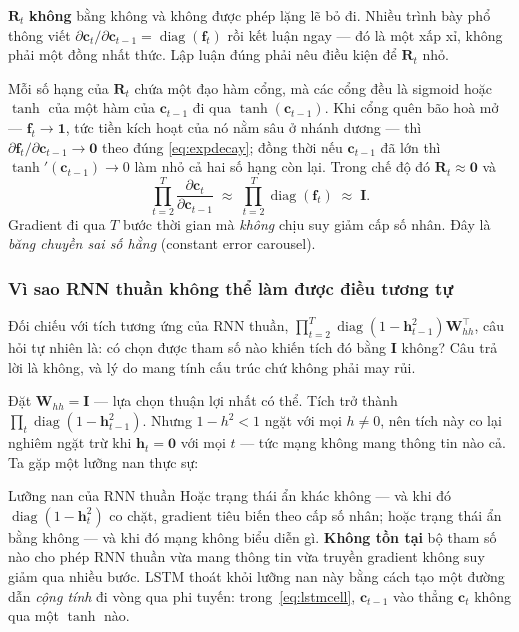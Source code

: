 \begin{notebox}
$\mathbf{R}_t$ \textbf{không} bằng không và không được phép lặng lẽ bỏ đi. Nhiều
trình bày phổ thông viết $\partial\mathbf{c}_t/\partial\mathbf{c}_{t-1} =
\operatorname{diag}(\mathbf{f}_t)$ rồi kết luận ngay --- đó là một xấp xỉ, không
phải một đồng nhất thức. Lập luận đúng phải nêu điều kiện để $\mathbf{R}_t$ nhỏ.
\end{notebox}

Mỗi số hạng của $\mathbf{R}_t$ chứa một đạo hàm cổng, mà các cổng đều là sigmoid
hoặc $\tanh$ của một hàm của $\mathbf{c}_{t-1}$ đi qua
$\tanh(\mathbf{c}_{t-1})$. Khi cổng quên bão hoà mở --- $\mathbf{f}_t\to\mathbf{1}$,
tức tiền kích hoạt của nó nằm sâu ở nhánh dương --- thì
$\partial\mathbf{f}_t/\partial\mathbf{c}_{t-1}\to\mathbf{0}$ theo đúng
\eqref{eq:expdecay}; đồng thời nếu $\mathbf{c}_{t-1}$ đã lớn thì
$\tanh'(\mathbf{c}_{t-1})\to0$ làm nhỏ cả hai số hạng còn lại. Trong chế độ đó
$\mathbf{R}_t\approx\mathbf{0}$ và
\begin{equation}
  \prod_{t=2}^{T}\frac{\partial\mathbf{c}_t}{\partial\mathbf{c}_{t-1}}
  \;\approx\;
  \prod_{t=2}^{T}\operatorname{diag}\!\left(\mathbf{f}_t\right)
  \;\approx\;
  \mathbf{I}.
  \label{eq:cec}
\end{equation}
Gradient đi qua $T$ bước thời gian mà \emph{không} chịu suy giảm cấp số nhân. Đây
là \emph{băng chuyền sai số hằng} (constant error carousel).

\subsubsection{Vì sao RNN thuần không thể làm được điều tương tự}

Đối chiếu với tích tương ứng của RNN thuần,
$\prod_{t=2}^{T}\operatorname{diag}(1-\mathbf{h}_{t-1}^2)\mathbf{W}_{hh}^{\top}$,
câu hỏi tự nhiên là: có chọn được tham số nào khiến tích đó bằng $\mathbf{I}$
không? Câu trả lời là không, và lý do mang tính cấu trúc chứ không phải may rủi.

Đặt $\mathbf{W}_{hh} = \mathbf{I}$ --- lựa chọn thuận lợi nhất có thể. Tích trở
thành $\prod_t\operatorname{diag}(1-\mathbf{h}_{t-1}^2)$. Nhưng
$1 - h^2 < 1$ ngặt với mọi $h\neq0$, nên tích này co lại nghiêm ngặt trừ khi
$\mathbf{h}_t = \mathbf{0}$ với mọi $t$ --- tức mạng không mang thông tin nào cả.
Ta gặp một lưỡng nan thực sự:

\begin{guidelinebox}{Lưỡng nan của RNN thuần}
Hoặc trạng thái ẩn khác không --- và khi đó $\operatorname{diag}(1-\mathbf{h}_t^2)$
co chặt, gradient tiêu biến theo cấp số nhân; hoặc trạng thái ẩn bằng không ---
và khi đó mạng không biểu diễn gì. \textbf{Không tồn tại} bộ tham số nào cho phép
RNN thuần vừa mang thông tin vừa truyền gradient không suy giảm qua nhiều bước.
LSTM thoát khỏi lưỡng nan này bằng cách tạo một đường dẫn \emph{cộng tính} đi
vòng qua phi tuyến: trong~\eqref{eq:lstmcell}, $\mathbf{c}_{t-1}$ vào thẳng
$\mathbf{c}_t$ không qua một $\tanh$ nào.
\end{guidelinebox}

